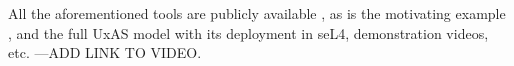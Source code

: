 All the aforementioned tools are publicly available \cite{fmide}, as is the motivating example \cite{repo}, and the full UxAS model with its deployment in seL4, demonstration videos, etc. \cite{phase2, camkes} ---ADD LINK TO VIDEO.   

\begin{comment}
Here is the basic process:
\begin{enumerate}
  \item CakeML provides a mechanism to take a defined logic in HOL4 and turn it into CakeML in a way that exactly preserves the meaning of the logic.
  \item Verified components are created by defining the meaning of the components in HOL4, and then using the existing theories to turn that meaning into CakeML
  \item Contiguity types provide a formalism for defining a language and recognizing membership in a language via a matcher
  \item Contiguity types include dependent types and the ability to define when a type is malformed
  \item Define a contract language that makes assumptions on input and guarantees properties on output
  \item Give meaning to the contract language in terms of traces (not easy to do because of the state)
  \item Show how the contract can be expressed in terms of a step function 
  \item The step-function is lifted to traces
  \item A contract defines a language over traces
  \item A step function recognizes membership in that language (prefix closed)
  \item Follow the same pattern used in contiguity types
  \item The CakeML comes for free once the HOL4 theories are shown
\end{enumerate}


Set the context for this work: define system level theorem that we intend to prove with the added components? Big picture of the overall goal of the project.

Components (complexity (and expressiveness) increases along the way):
* Filter: takes a stream of data and delivers a new stream of data where the property is enforced--reasons over an infinite stream of date. Connects to the system correctness over traces. Predicate on a single piece of data, paying no attention to previous history--no temporal awareness, deciting if it passes or not. Can be very secure and very efficient.
* Monitor: Captures a relation over time on the data. Is able to reason about temporal properties. Supports multiple inputs and is able to do arbitrary computation for complex output over the inputs.


\end{comment}
